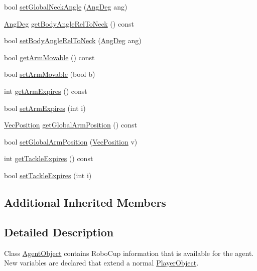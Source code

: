 \begin{DoxyCompactItemize}
\item 
bool \hyperlink{classAgentObject_ae340af787802701523f55cd40555b93e}{set\+Global\+Neck\+Angle} (\hyperlink{Geometry_8h_a6bfe02ae9bb185092902092561ab2865}{Ang\+Deg} ang)
\item 
\hyperlink{Geometry_8h_a6bfe02ae9bb185092902092561ab2865}{Ang\+Deg} \hyperlink{classAgentObject_aa259adf422ce7d54ae7c94b20a44c2f4}{get\+Body\+Angle\+Rel\+To\+Neck} () const 
\item 
bool \hyperlink{classAgentObject_abe8da0bb6a593c714986abacc4e5ec1b}{set\+Body\+Angle\+Rel\+To\+Neck} (\hyperlink{Geometry_8h_a6bfe02ae9bb185092902092561ab2865}{Ang\+Deg} ang)
\item 
bool \hyperlink{classAgentObject_a8ee30512544a38fb49be8667e8ed0771}{get\+Arm\+Movable} () const 
\item 
bool \hyperlink{classAgentObject_aabacf8e03d85102c4f89da2420617ab0}{set\+Arm\+Movable} (bool b)
\item 
int \hyperlink{classAgentObject_a0c8a7da5056999e880824a822a5f0e52}{get\+Arm\+Expires} () const 
\item 
bool \hyperlink{classAgentObject_af0d42bee948a9f5f145a39e7caed4d46}{set\+Arm\+Expires} (int i)
\item 
\hyperlink{classVecPosition}{Vec\+Position} \hyperlink{classAgentObject_a1e30ba9c7314fd067e4783aaf481d134}{get\+Global\+Arm\+Position} () const 
\item 
bool \hyperlink{classAgentObject_a238bbacbf6083bbf1cfa1ff986aa9df5}{set\+Global\+Arm\+Position} (\hyperlink{classVecPosition}{Vec\+Position} v)
\item 
int \hyperlink{classAgentObject_a63e7f857385824d37e63aaa5f7caf117}{get\+Tackle\+Expires} () const 
\item 
bool \hyperlink{classAgentObject_a20855b8884bf0e247aeb402661803fd8}{set\+Tackle\+Expires} (int i)
\end{DoxyCompactItemize}
\subsection*{Additional Inherited Members}


\subsection{Detailed Description}
Class \hyperlink{classAgentObject}{Agent\+Object} contains Robo\+Cup information that is available for the agent. New variables are declared that extend a normal \hyperlink{classPlayerObject}{Player\+Object}. 

